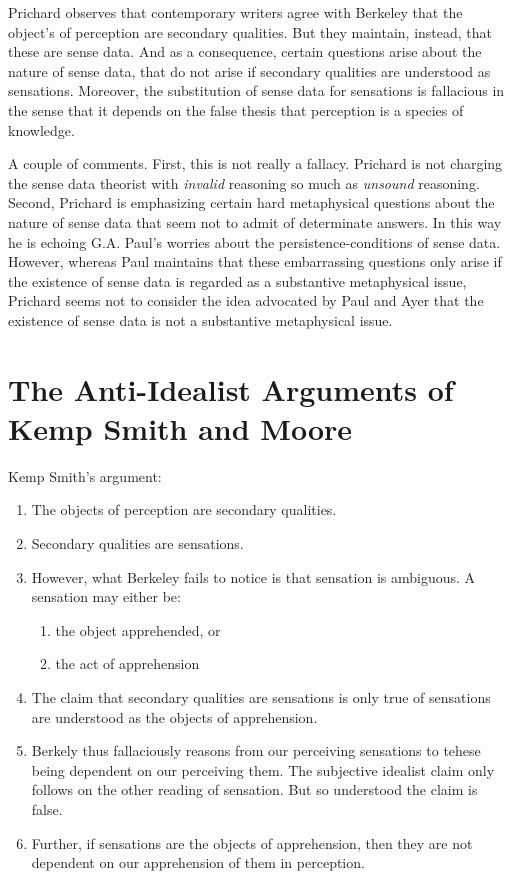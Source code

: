 \documentclass[11pt]{article}
\begin{document}
Prichard observes that contemporary writers agree with Berkeley that the object's of perception are secondary qualities. But they maintain, instead, that these are sense data. And as a consequence, certain questions arise about the nature of sense data, that do not arise if secondary qualities are understood as sensations. Moreover, the substitution of sense data for sensations is fallacious in the sense that it depends on the false thesis that perception is a species of knowledge.

A couple of comments. First, this is not really a fallacy. Prichard is not charging the sense data theorist with \emph{invalid} reasoning so much as \emph{unsound} reasoning. Second, Prichard is emphasizing certain hard metaphysical questions about the nature of sense data that seem not to admit of determinate answers. In this way he is echoing G.A. Paul's worries about the persistence-conditions of sense data. However, whereas Paul maintains that these embarrassing questions only arise if the existence of sense data is regarded as a substantive metaphysical issue, Prichard seems not to consider the idea advocated by Paul and Ayer that the existence of sense data is not a substantive metaphysical issue.

\section{The Anti-Idealist Arguments of Kemp Smith and Moore} %
\label{sec:the_anti_idealist_arguments_of_kemp_smith_and_moore}
Kemp Smith's argument:
\begin{enumerate}
    \item The objects of perception are secondary qualities.
    \item Secondary qualities are sensations.
    \item However, what Berkeley fails to notice is that sensation is ambiguous. A sensation may either be:
    \begin{enumerate}
        \item the object apprehended, or
        \item the act of apprehension
    \end{enumerate}
    \item The claim that secondary qualities are sensations is only true of sensations are understood as the objects of apprehension.
    \item Berkely thus fallaciously reasons from our perceiving sensations to tehese being dependent on our perceiving them. The subjective idealist claim only follows on the other reading of sensation. But so understood the claim is false.
    \item Further, if sensations are the objects of apprehension, then they are not dependent on our apprehension of them in perception.
\end{enumerate}
\end{document}

